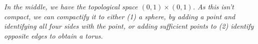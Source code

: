 \begin{center}

\emph{In the middle, we have the topological space 
$(0,1)\times (0,1)$. As this isn't compact, we can compactify it 
to either (1) a sphere, 
by adding a point and identifying all four sides with the point, 
or adding sufficient points to (2) identify opposite edges 
to obtain a torus.}
\end{center}